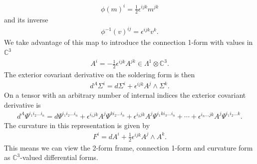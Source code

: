 \documentclass[10pt]{report}
\theoremstyle{definition}
\newcommand{\C}[0]{\mathbb{C}}
\newcommand{\E}[0]{\C^3}
\begin{document}
\begin{align}
    \phi(m)^i = \frac{1}{2} \epsilon^{ijk} m^{jk} \label{eq:pleb-isomorphism-antisym-matrices-and-vector-C3}
\end{align}
and its inverse 
\begin{align}
    \phi^{-1}(v)^{ij} = \epsilon^{ijk} v^k.
\end{align}
We take advantage of this map to introduce the connection 1-form with values in $\E$
\begin{align}
    A^i = -\frac{1}{2} \epsilon^{ijk} A^{jk} \in \Lambda^1 \otimes \E.
\end{align}
The exterior covariant derivative on the soldering form is then 
\begin{align}
    d^A \Sigma^i = d\Sigma^i + \epsilon^{ijk} A^j \wedge \Sigma^k.
\end{align}
On a tensor with an arbitrary number of internal indices the exterior covariant derivative is 
\begin{align}
    d^A \Psi^{i_1 i_2 \ldots i_n} = d \Psi^{i_1 i_2 \ldots i_n} + \epsilon^{i_1 j k} A^j \Psi^{k i_2 \ldots i_n} + \epsilon^{i_2 j k} A^j \Psi^{i_1 k i_3 \ldots i_n} + \cdots + \epsilon^{i_n \ldots j k} A^j \Psi^{i_1 i_2 \ldots k}.
\end{align}
The curvature in this representation is given by
\begin{align}
    F^i = dA^i + \frac{1}{2} \epsilon^{ijk} A^j \wedge A^k.
\end{align}
This means we can view the 2-form frame, connection 1-form and curvature form as $\E$-valued differential forms.
\end{document}
